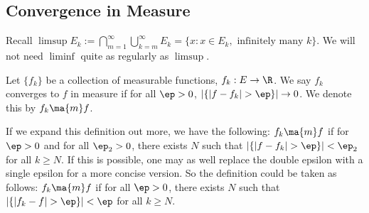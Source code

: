










\subsection{Convergence in Measure}

Recall $\limsup E_k:= \bigcap_{m=1}^\infty \bigcup_{k=m}^\infty E_k= \{ x \colon x \in E_k, \text{ infinitely many }k\}$. We will not need $\liminf$ quite as regularly as $\limsup$.



\begin{dfn}
Let $\{f_k\}$ be a collection of measurable functions, $f_k: E \to \R$. We say $f_k$ converges to $f$ in measure if for all $\ep>0$, $|\{ |f-f_k|>\ep\}| \to 0$. We denote this by $f_k \ma{m} f$. 
\end{dfn}


If we expand this definition out more, we have the following: $f_k \ma{m} f$ if for $\ep>0$ and for all $\ep_2>0$, there exists $N$ such that $|\{ |f-f_k|>\ep\}|<\ep_2$ for all $k \geq N$. If this is possible, one may as well replace the double epsilon with a single epsilon for a more concise version. So the definition could be taken as follows: $f_k \ma{m} f$ if for all $\ep>0$, there exists $N$ such that $|\{ |f_k-f|>\ep\}|<\ep$ for all $k \geq N$. 


